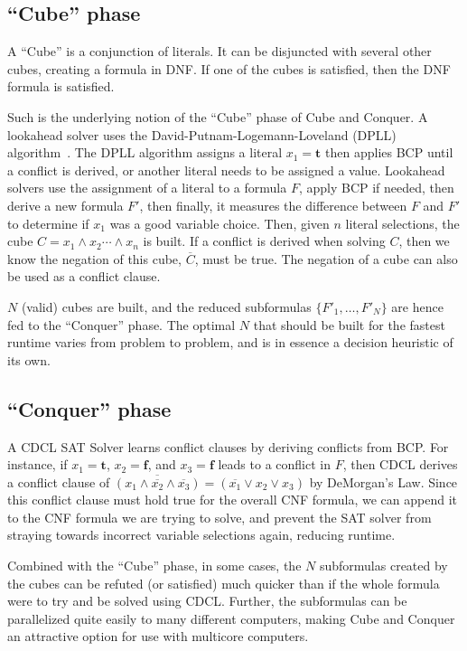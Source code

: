 \subsection{``Cube'' phase} \label{subsubsec:cnccube}
A ``Cube'' is a conjunction of literals. It can be disjuncted with several other cubes, creating a formula in DNF. If one of the cubes is satisfied, then the DNF formula is satisfied. \par
Such is the underlying notion of the ``Cube'' phase of Cube and Conquer. A lookahead solver uses the David-Putnam-Logemann-Loveland (DPLL) algorithm~\cite{Davis:1962:MPT:368273.368557}. The DPLL algorithm assigns a literal $x_1 = \boldsymbol t$ then applies BCP until a conflict is derived, or another literal needs to be assigned a value. Lookahead solvers use the assignment of a literal to a formula $F$, apply BCP if needed, then derive a new formula $F'$, then finally, it measures the difference between $F$ and $F'$ to determine if $x_1$ was a good variable choice.  Then, given $n$ literal selections, the cube $C = x_1 \wedge x_2 \cdots \wedge x_n$ is built. If a conflict is derived when solving $C$, then we know the negation of this cube, $\overline{C}$, must be true. The negation of a cube can also be used as a conflict clause. \par
$N$ (valid) cubes are built, and the reduced subformulas $\{F'_1, \ldots, F'_N\}$ are hence fed to the ``Conquer'' phase. The optimal $N$ that should be built for the fastest runtime varies from problem to problem, and is in essence a decision heuristic of its own.

 \subsection{``Conquer'' phase} \label{subsubsec:cncconquer}
 A CDCL SAT Solver learns conflict clauses by deriving conflicts from BCP. For instance, if $x_1 = \boldsymbol t$, $x_2 = \boldsymbol f$, and $x_3 = \boldsymbol f$ leads to a conflict in $F$, then CDCL derives a conflict clause of $\overline{(x_1 \wedge \overline{x_2} \wedge \overline{x_3})} = (\overline{x_1} \vee x_2 \vee x_3)$ by DeMorgan's Law. Since this conflict clause must hold true for the overall CNF formula, we can append it to the CNF formula we are trying to solve, and prevent the SAT solver from straying towards incorrect variable selections again, reducing runtime. \par
 Combined with the ``Cube'' phase, in some cases, the $N$ subformulas created by the cubes can be refuted (or satisfied) much quicker than if the whole formula were to try and be solved using CDCL. Further, the subformulas can be parallelized quite easily to many different computers, making Cube and Conquer an attractive option for use with multicore computers.